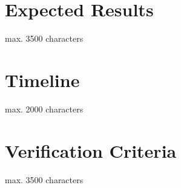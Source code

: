 \documentclass[12pt]{article}
\begin{document}
\newpage
\section{Expected Results}
max. 3500 characters

\newpage
\section{Timeline}
max. 2000 characters

\newpage
\section{Verification Criteria}
max. 3500 characters

\clearpage

\renewcommand{\refname}{References}



\end{document}
